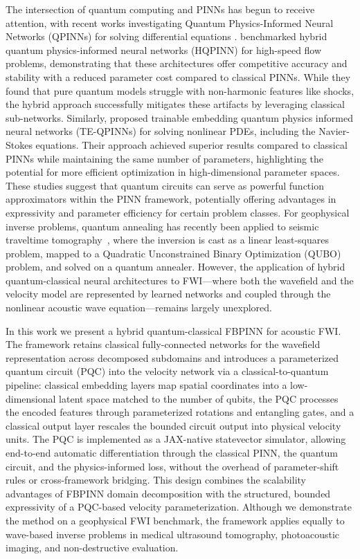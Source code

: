The intersection of quantum computing and PINNs has begun to receive attention, with recent works investigating Quantum Physics-Informed Neural Networks (QPINNs) for solving differential equations \parencite{https://doi.org/10.1002/qute.202300065}. \textcite{LEONG2025106782} benchmarked hybrid quantum physics-informed neural networks (HQPINN) for high-speed flow problems, demonstrating that these architectures offer competitive accuracy and stability with a reduced parameter cost compared to classical PINNs. While they found that pure quantum models struggle with non-harmonic features like shocks, the hybrid approach successfully mitigates these artifacts by leveraging classical sub-networks. Similarly, \textcite{Berger2025} proposed trainable embedding quantum physics informed neural networks (TE-QPINNs) for solving nonlinear PDEs, including the Navier-Stokes equations. Their approach achieved superior results compared to classical PINNs while maintaining the same number of parameters, highlighting the potential for more efficient optimization in high-dimensional parameter spaces. These studies suggest that quantum circuits can serve as powerful function approximators within the PINN framework, potentially offering advantages in expressivity and parameter efficiency for certain problem classes. For geophysical inverse problems, quantum annealing has recently been applied to seismic traveltime tomography~, where the inversion is cast as a linear least-squares problem, mapped to a Quadratic Unconstrained Binary Optimization (QUBO) problem, and solved on a quantum annealer. However, the application of hybrid quantum-classical neural architectures to FWI---where both the wavefield and the velocity model are represented by learned networks and coupled through the nonlinear acoustic wave equation---remains largely unexplored.

In this work we present a hybrid quantum-classical FBPINN for acoustic FWI. The framework retains classical fully-connected networks for the wavefield representation across decomposed subdomains and introduces a parameterized quantum circuit (PQC) into the velocity network via a classical-to-quantum pipeline: classical embedding layers map spatial coordinates into a low-dimensional latent space matched to the number of qubits, the PQC processes the encoded features through parameterized rotations and entangling gates, and a classical output layer rescales the bounded circuit output into physical velocity units. The PQC is implemented as a JAX-native statevector simulator, allowing end-to-end automatic differentiation through the classical PINN, the quantum circuit, and the physics-informed loss, without the overhead of parameter-shift rules or cross-framework bridging. This design combines the scalability advantages of FBPINN domain decomposition with the structured, bounded expressivity of a PQC-based velocity parameterization. Although we demonstrate the method on a geophysical FWI benchmark, the framework applies equally to wave-based inverse problems in medical ultrasound tomography, photoacoustic imaging, and non-destructive evaluation.

